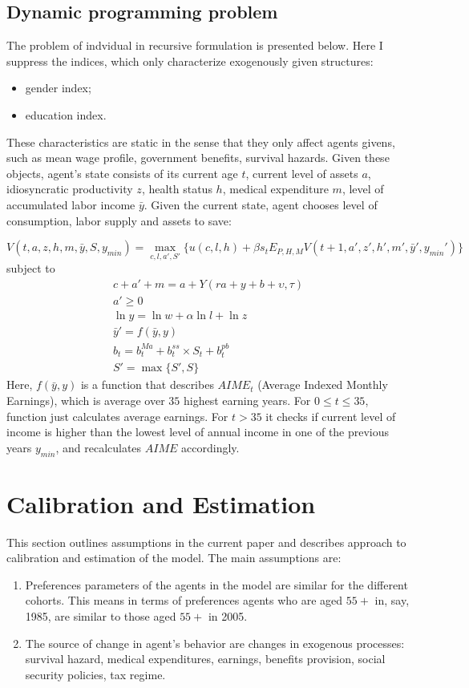 \documentclass[
10pt, %
a4paper, %
oneside, %
headinclude,footinclude, %
BCOR5mm, %
]{scrartcl}
\begin{document}
\subsection{Dynamic programming problem}
The problem of indvidual in recursive formulation is presented below. Here I suppress the indices, which only characterize exogenously given structures:
\begin{itemize}
\item gender index;
\item education index.
\end{itemize}
These characteristics are static in the sense that they only affect agents givens, such as mean wage profile, government benefits, survival hazards. Given these objects, agent's state consists of its current age $t$, current level of assets $a$, idiosyncratic productivity $z$, health status $h$, medical expenditure $m$, level of accumulated labor income $\bar{y}$. Given the current state, agent chooses level of consumption, labor supply and assets to save:

\begin{equation}
V(t,a,z,h,m,\bar{y},S,y_{min}) = \max_{c,l,a',S'}\{u(c,l,h) + \beta s_t  E_{P,H,M} V(t+1,a',z',h',m',\bar{y}',y_{min}')\}
\end{equation}
subject to 
\begin{eqnarray*}
c + a' +m = a+Y(ra+y+b+\upsilon,\tau) \\
a'\ge0 \\
\ln y = \ln w+\alpha \ln l + \ln z \\
\bar{y}' = f(\bar{y},y)\\
b_t = b_t^{Ma} + b_t^{ss}\times S_t+b_t^{pb} \\
S' = \max\{S',S\}
\end{eqnarray*}
Here, $f(\bar{y},y)$ is a function that describes $AIME_t$ (Average Indexed Monthly Earnings), which is average over $35$ highest earning years. For $0\le t \le 35$, function just calculates average earnings. For $t>35$ it checks if current level of income is higher than the lowest level of annual income in one of the previous years $y_{min}$, and recalculates $AIME$ accordingly.  

\section{Calibration and Estimation}
This section outlines assumptions in the current paper and describes approach to calibration and estimation of the model.
The main assumptions are:
\begin{enumerate}
\item Preferences parameters of the agents in the model are similar for the different cohorts. This means in terms of preferences agents who are aged $55+$ in, say, 1985, are similar to those aged $55+$ in 2005.
\item The source of change in agent's behavior are changes in exogenous processes: survival hazard, medical expenditures, earnings, benefits provision, social security policies, tax regime.
\end{enumerate}
\end{document}
